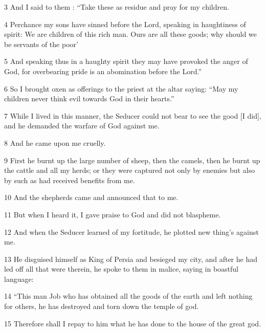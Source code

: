 \par 3 And I said to them : “Take these as residue and pray for my children.

\par 4 Perchance my sons have sinned before the Lord, speaking in haughtiness of spirit: We are children of this rich man. Ours are all these goods; why should we be servants of the poor’

\par 5 And speaking thus in a haughty spirit they may have provoked the anger of God, for overbearing pride is an abomination before the Lord.”

\par 6 So I brought oxen as offerings to the priest at the altar saying: “May my children never think evil towards God in their hearts.”

\par 7 While I lived in this manner, the Seducer could not bear to see the good [I did], and he demanded the warfare of God against me.

\par 8 And he came upon me cruelly.

\par 9 First he burnt up the large number of sheep, then the camels, then he burnt up the cattle and all my herds; or they were captured not only by enemies but also by such as had received benefits from me.

\par 10 And the shepherds came and announced that to me.

\par 11 But when I heard it, I gave praise to God and did not blaspheme.

\par 12 And when the Seducer learned of my fortitude, he plotted new thing’s against me.

\par 13 He disguised himself as King of Persia and besieged my city, and after he had led off all that were therein, he spoke to them in malice, saying in boastful language:

\par 14 “This man Job who has obtained all the goods of the earth and left nothing for others, he has destroyed and torn down the temple of god.

\par 15 Therefore shall I repay to him what he has done to the house of the great god.

